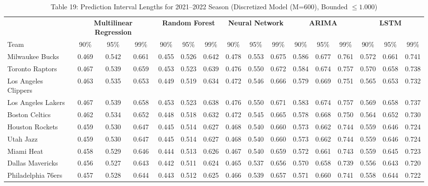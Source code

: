 \documentclass[11pt,a4paper]{article}
\begin{document}
\begin{table}[H]
\centering
\caption{Table 19: Prediction Interval Lengths for 2021--2022 Season (Discretized Model (M=600), Bounded $\le 1.000$)}
\label{tab:team_table19}
\tiny
\setlength{\tabcolsep}{1.5pt}
\begin{tabular}{l ccc ccc ccc ccc ccc}
\toprule
 & \multicolumn{3}{c}{\textbf{Multilinear Regression}} & \multicolumn{3}{c}{\textbf{Random Forest}} & \multicolumn{3}{c}{\textbf{Neural Network}} & \multicolumn{3}{c}{\textbf{ARIMA}} & \multicolumn{3}{c}{\textbf{LSTM}} \\
\cmidrule(lr){2-4} \cmidrule(lr){5-7} \cmidrule(lr){8-10} \cmidrule(lr){11-13} \cmidrule(lr){14-16}
Team & 90\% & 95\% & 99\% & 90\% & 95\% & 99\% & 90\% & 95\% & 99\% & 90\% & 95\% & 99\% & 90\% & 95\% & 99\% \\
\midrule
Milwaukee Bucks & 0.469 & 0.542 & 0.661 & 0.455 & 0.526 & 0.642 & 0.478 & 0.553 & 0.675 & 0.586 & 0.677 & 0.761 & 0.572 & 0.661 & 0.741 \\
Toronto Raptors & 0.467 & 0.539 & 0.659 & 0.453 & 0.523 & 0.639 & 0.476 & 0.550 & 0.672 & 0.584 & 0.674 & 0.757 & 0.570 & 0.658 & 0.738 \\
Los Angeles Clippers & 0.463 & 0.535 & 0.653 & 0.449 & 0.519 & 0.634 & 0.472 & 0.546 & 0.666 & 0.579 & 0.669 & 0.751 & 0.565 & 0.653 & 0.732 \\
Los Angeles Lakers & 0.467 & 0.539 & 0.658 & 0.453 & 0.523 & 0.638 & 0.476 & 0.550 & 0.671 & 0.583 & 0.674 & 0.757 & 0.569 & 0.658 & 0.737 \\
Boston Celtics & 0.462 & 0.534 & 0.652 & 0.448 & 0.518 & 0.632 & 0.472 & 0.545 & 0.665 & 0.578 & 0.668 & 0.750 & 0.564 & 0.652 & 0.730 \\
Houston Rockets & 0.459 & 0.530 & 0.647 & 0.445 & 0.514 & 0.627 & 0.468 & 0.540 & 0.660 & 0.573 & 0.662 & 0.744 & 0.559 & 0.646 & 0.724 \\
Utah Jazz & 0.459 & 0.530 & 0.647 & 0.445 & 0.514 & 0.627 & 0.468 & 0.540 & 0.660 & 0.573 & 0.662 & 0.744 & 0.559 & 0.646 & 0.724 \\
Miami Heat & 0.458 & 0.529 & 0.646 & 0.444 & 0.513 & 0.626 & 0.467 & 0.540 & 0.659 & 0.572 & 0.661 & 0.743 & 0.559 & 0.645 & 0.723 \\
Dallas Mavericks & 0.456 & 0.527 & 0.643 & 0.442 & 0.511 & 0.624 & 0.465 & 0.537 & 0.656 & 0.570 & 0.658 & 0.739 & 0.556 & 0.643 & 0.720 \\
Philadelphia 76ers & 0.457 & 0.528 & 0.644 & 0.443 & 0.512 & 0.625 & 0.466 & 0.539 & 0.657 & 0.571 & 0.660 & 0.741 & 0.558 & 0.644 & 0.722 \\

\end{tabular}
\end{table}
\end{document}
